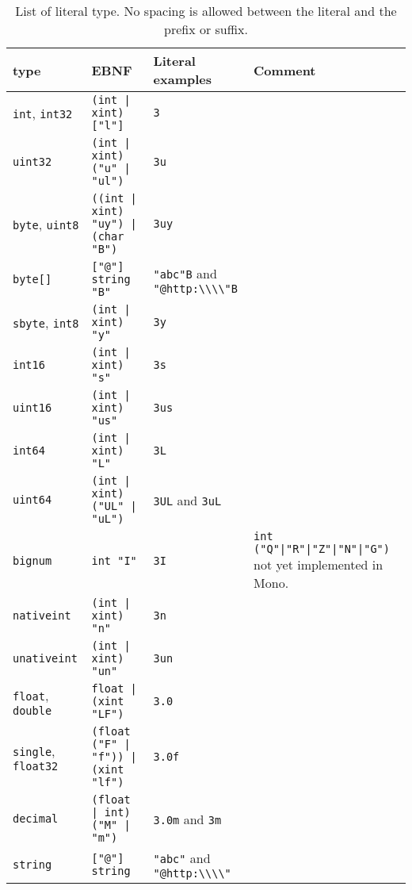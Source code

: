 \begin{table}
  \centering
  \begin{tabularx}{\linewidth}{|l|l|l|X|}
    \hline
    type & EBNF & Literal examples & Comment \\
    \hline
    \lstinline!int!, \lstinline!int32! & \lstinline[language=ebnf]!(int | xint) ["l"]!  & \lstinline!3! & \\
    \lstinline!uint32! & \lstinline[language=ebnf]!(int | xint) ("u" | "ul")! & \lstinline!3u! & \\
    \lstinline!byte!, \lstinline!uint8! & \lstinline[language=ebnf]!((int | xint) "uy") | (char "B")!  & \lstinline!3uy!  & \\
    \lstinline!byte[]! & \lstinline[language=ebnf]!["@"] string "B"!  & \lstinline!"abc"B! and \lstinline!"@http:\\\\"B!  & \\
    \lstinline!sbyte!, \lstinline!int8! & \lstinline[language=ebnf]!(int | xint) "y"! & \lstinline!3y!  & \\
    \lstinline!int16! & \lstinline[language=ebnf]!(int | xint) "s"!  & \lstinline!3s!  & \\
    \lstinline!uint16! & \lstinline[language=ebnf]!(int | xint) "us"! & \lstinline!3us!  & \\
    \lstinline!int64! & \lstinline[language=ebnf]!(int | xint) "L"!  & \lstinline!3L!  & \\
    \lstinline!uint64! & \lstinline[language=ebnf]!(int | xint) ("UL" | "uL")!  & \lstinline!3UL! and \lstinline!3uL!  & \\
    \lstinline!bignum! & \lstinline[language=ebnf]!int "I"! & \lstinline!3I!  & \lstinline[language=ebnf]!int ("Q"|"R"|"Z"|"N"|"G")! not yet implemented in Mono.\\
    \lstinline!nativeint! & \lstinline[language=ebnf]!(int | xint) "n"! & \lstinline!3n!  & \\
    \lstinline!unativeint! & \lstinline[language=ebnf]!(int | xint) "un"!  & \lstinline!3un!  & \\
    \lstinline!float!, \lstinline!double! & \lstinline[language=ebnf]!float | (xint "LF")!  & \lstinline!3.0!  & \\
    \lstinline!single!, \lstinline!float32! & \lstinline[language=ebnf]!(float ("F" | "f")) | (xint "lf") !  & \lstinline!3.0f!  & \\
    \lstinline!decimal! &\lstinline[language=ebnf]!(float | int) ("M" | "m")! & \lstinline!3.0m! and \lstinline!3m!  & \\
    \lstinline!string! & \lstinline[language=ebnf]!["@"] string!  & \lstinline!"abc"! and \lstinline!"@http:\\\\"!  & \\
    \hline
  \end{tabularx}
  \caption{List of literal type. No spacing is allowed between the literal and the prefix or suffix.}
  \label{tab:literalTypes}
\end{table}

